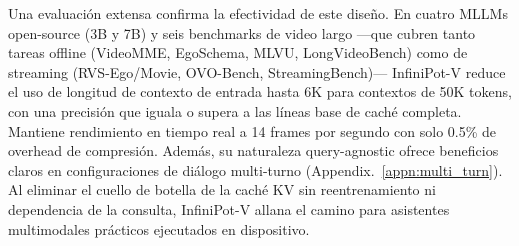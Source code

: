Una evaluación extensa confirma la efectividad de este diseño. En cuatro MLLMs open-source (3B y 7B) y seis benchmarks de video largo ---que cubren tanto tareas offline (VideoMME, EgoSchema, MLVU, LongVideoBench) como de streaming (RVS-Ego/Movie, OVO-Bench, StreamingBench)--- InfiniPot-V reduce el uso de longitud de contexto de entrada hasta 6K para contextos de 50K tokens, con una precisión que iguala o supera a las líneas base de caché completa. Mantiene rendimiento en tiempo real a 14 frames por segundo con solo 0.5\% de overhead de compresión. Además, su naturaleza query-agnostic ofrece beneficios claros en configuraciones de diálogo multi-turno (Appendix.~\ref{appn:multi_turn}). Al eliminar el cuello de botella de la caché KV sin reentrenamiento ni dependencia de la consulta, InfiniPot-V allana el camino para asistentes multimodales prácticos ejecutados en dispositivo.
